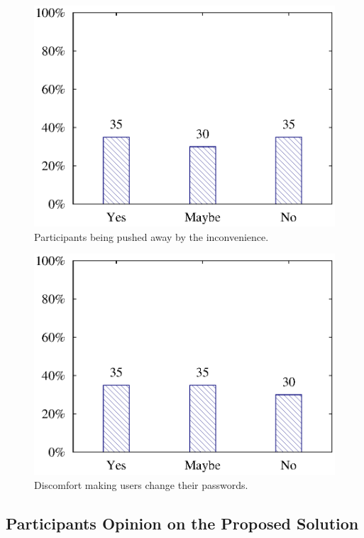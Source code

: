 \begin{figure}[H]
\centering
\includegraphics[scale=.7]{files/question5/question5.eps}
\caption{Participants being pushed away by the inconvenience.}
\label{fig:digraph}
\end{figure}

\begin{figure}[H]
\centering
\includegraphics[scale=.7]{files/question6/question6.eps}
\caption{Discomfort making users change their passwords. }
\label{fig:digraph}
\end{figure}

\subsection{Participants Opinion on the Proposed Solution}

